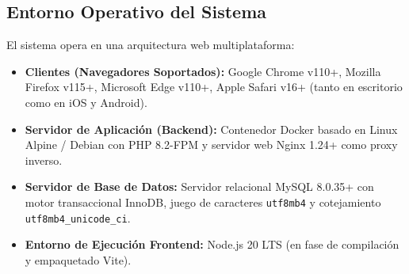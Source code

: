 \subsection{Entorno Operativo del Sistema}
El sistema opera en una arquitectura web multiplataforma:
\begin{itemize}[leftmargin=*]
    \item \textbf{Clientes (Navegadores Soportados):} Google Chrome v110+, Mozilla Firefox v115+, Microsoft Edge v110+, Apple Safari v16+ (tanto en escritorio como en iOS y Android).
    \item \textbf{Servidor de Aplicación (Backend):} Contenedor Docker basado en Linux Alpine / Debian con PHP 8.2-FPM y servidor web Nginx 1.24+ como proxy inverso.
    \item \textbf{Servidor de Base de Datos:} Servidor relacional MySQL 8.0.35+ con motor transaccional InnoDB, juego de caracteres \texttt{utf8mb4} y cotejamiento \texttt{utf8mb4\_unicode\_ci}.
    \item \textbf{Entorno de Ejecución Frontend:} Node.js 20 LTS (en fase de compilación y empaquetado Vite).
\end{itemize}

